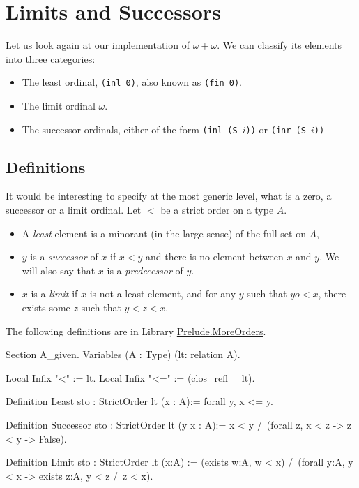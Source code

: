 %



\section{Limits and Successors}

Let us look again at our implementation of $\omega+\omega$. We can classify its elements into three categories:

\begin{itemize}
\item The least ordinal, \texttt{(inl 0)}, also known as  \texttt{(fin 0)}.
\item The limit ordinal $\omega$.
\item The successor ordinals, either of the form \texttt{(inl (S $i$))} or \texttt{(inr (S $i$))}
\end{itemize}

\subsection{Definitions}
It would be interesting to specify at the most generic level, what is a zero, a successor or a limit ordinal. Let $<$ be a strict order on a type $A$.

\begin{itemize}
\item A \emph{least} element is a minorant (in the large sense) of the full set  on $A$,
\item $y$ is a \emph{successor} of $x$ if $x<y$ and there is no element between $x$ and $y$. We will also say that $x$ is a \emph{predecessor} of $y$.
\item $x$ is a \emph{limit} if $x$ is not a least element, and for any $y$ such that $yo<x$,
 there exists some $z$ such that $y<z<x$.
\end{itemize}


The following definitions are in Library \href{../theories/html/hydras.Prelude.MoreOrders.html}{Prelude.MoreOrders}.

\begin{Coqsrc}
Section A_given.
  Variables (A : Type)  (lt: relation A).
  
Local Infix "<" := lt.
Local Infix "<=" := (clos_refl _ lt).

Definition Least {sto : StrictOrder lt} (x : A):=
  forall y,  x <= y.

Definition Successor {sto : StrictOrder lt} (y x : A):=
  x < y /\ (forall z,  x < z ->  z <  y -> False).

Definition Limit {sto : StrictOrder lt}  (x:A)  :=
  (exists w:A,  w < x) /\
  (forall y:A, y < x -> exists z:A, y < z /\ z < x).
\end{Coqsrc}

